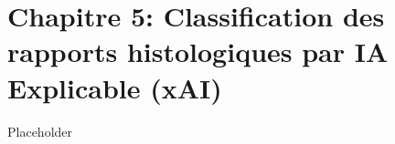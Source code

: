 \chapter*{Chapitre 5: Classification des rapports histologiques par IA Explicable (xAI)}
Placeholder